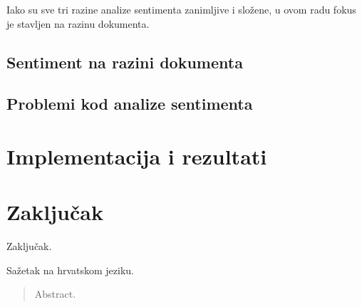 \documentclass[times, utf8, zavrsni, numeric]{fer}
\begin{document}
Iako su sve tri razine analize sentimenta zanimljive i složene, u ovom radu fokus je stavljen na 
razinu dokumenta.

\section{Sentiment na razini dokumenta} \label{sadoc}

\section{Problemi kod analize sentimenta} \label{saprob}

\chapter{Implementacija i rezultati} \label{eksperiment}

\chapter{Zaključak} \label{zakljucak}
Zaključak.




\begin{sazetak}
Sažetak na hrvatskom jeziku.

\end{sazetak}

\begin{abstract}
Abstract.

\end{abstract}
\end{document}
